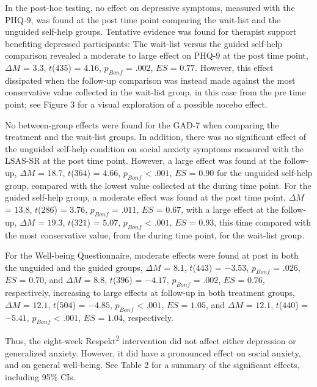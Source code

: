 \documentclass[preprint,
3p]{elsarticle} %
\begin{document}
In the post-hoc testing, no effect on depressive symptoms, measured with
the PHQ-9, was found at the post time point comparing the wait-list and
the unguided self-help groups. Tentative evidence was found for
therapist support benefiting depressed participants: The wait-list
versus the guided self-help comparison revealed a moderate to large
effect on PHQ-9 at the post time point, \(\Delta M\) = \(3.3\),
\(t\)(\(435\)) = \(4.16\), \(p_{ Bonf }\) = \(.002\), \(ES\) = \(0.77\).
However, this effect dissipated when the follow-up comparison was
instead made against the most conservative value collected in the
wait-list group, in this case from the pre time point; see Figure 3 for
a visual exploration of a possible nocebo effect.

No between-group effects were found for the GAD-7 when comparing the
treatment and the wait-list groups. In addition, there was no
significant effect of the unguided self-help condition on social anxiety
symptoms measured with the LSAS-SR at the post time point. However, a
large effect was found at the follow-up, \(\Delta M\) = \(18.7\),
\(t\)(\(364\)) = \(4.66\), \(p_{ Bonf }\) \textless{} \(.001\), \(ES\) =
\(0.90\) for the unguided self-help group, compared with the lowest
value collected at the during time point. For the guided self-help
group, a moderate effect was found at the post time point, \(\Delta M\)
= \(13.8\), \(t\)(\(286\)) = \(3.76\), \(p_{ Bonf }\) = \(.011\), \(ES\)
= \(0.67\), with a large effect at the follow-up, \(\Delta M\) =
\(19.3\), \(t\)(\(321\)) = \(5.07\), \(p_{ Bonf }\) \textless{}
\(.001\), \(ES\) = \(0.93\), this time compared with the most
conservative value, from the during time point, for the wait-list group.

For the Well-being Questionnaire, moderate effects were found at post in
both the unguided and the guided groups, \(\Delta M\) = \(8.1\),
\(t\)(\(443\)) = \(-3.53\), \(p_{ Bonf }\) = \(.026\), \(ES\) =
\(0.70\), and \(\Delta M\) = \(8.8\), \(t\)(\(396\)) = \(-4.17\),
\(p_{ Bonf }\) = \(.002\), \(ES\) = \(0.76\), respectively, increasing
to large effects at follow-up in both treatment groups, \(\Delta M\) =
\(12.1\), \(t\)(\(504\)) = \(-4.85\), \(p_{ Bonf }\) \textless{}
\(.001\), \(ES\) = \(1.05\), and \(\Delta M\) = \(12.1\), \(t\)(\(440\))
= \(-5.41\), \(p_{ Bonf }\) \textless{} \(.001\), \(ES\) = \(1.04\),
respectively.

Thus, the eight-week Respekt\textsuperscript{2} intervention did not
affect either depression or generalized anxiety. However, it did have a
pronounced effect on social anxiety, and on general well-being. See
Table 2 for a summary of the significant effects, including 95\% CIs.
\end{document}
